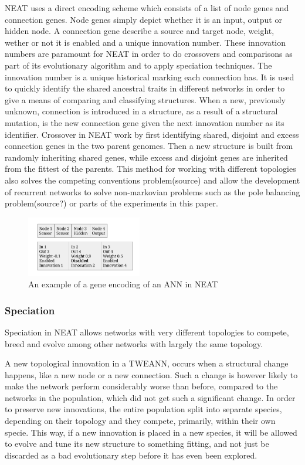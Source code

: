 NEAT uses a direct encoding scheme which consists of a list of node genes and connection genes. Node genes simply depict whether it is an input, output or hidden node. A connection gene describe a source and target node, weight, wether or not it is enabled and a unique innovation number. 
These innovation numbers are paramount for NEAT in order to do crossovers and comparisons as part of its evolutionary algorithm and to apply speciation techniques. The innovation number is a unique historical marking each connection has. It is used to quickly identify the shared ancestral traits in different networks in order to give a means of comparing and classifying structures. When a new, previously unknown, connection is introduced in a structure, as a result of a structural mutation, is the new connection gene given the next innovation number as its identifier.
Crossover in NEAT work by first identifying shared, disjoint and excess connection genes in the two parent genomes. Then a new structure is built from randomly inheriting shared genes, while excess and disjoint genes are inherited from the fittest of the parents. This method for working with different topologies also solves the competing conventions problem(source) and allow the development of recurrent networks to solve non-markovian problems such as the pole balancing problem(source?) or parts of the experiments in this paper.

\begin{figure}[H]
	\centering
	\includegraphics[width=190px]{img/genotype.png}
	\caption{An example of a gene encoding of an ANN in NEAT}
	\label{fig:genotype}
\end{figure}

\subsubsection{Speciation}
Speciation in NEAT allows networks with very different topologies to compete, breed and evolve among other networks with largely the same topology.

A new topological innovation in a TWEANN, occurs when a structural change happens, like a new node or a new connection. Such a change is however likely to make the network perform considerably worse than before, compared to the networks in the population, which did not get such a significant change. In order to preserve new innovations, the entire population split into separate species, depending on their topology and they compete, primarily, within their own specie. This way, if a new innovation is placed in a new species, it will be allowed to evolve and tune its new structure to something fitting, and not just be discarded as a bad evolutionary step before it has even been explored.

